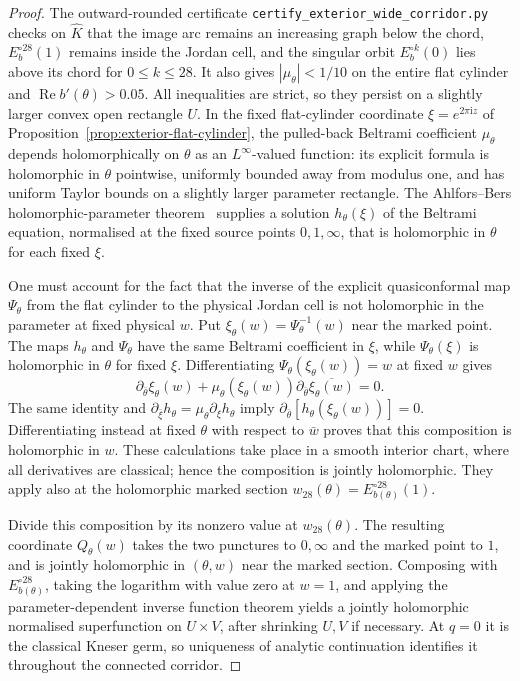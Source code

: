 \documentclass[11pt]{amsart}
\theoremstyle{definition}
\newcommand{\ii}{\mathrm{i}}
\begin{document}
\begin{proof}
The outward-rounded certificate
\texttt{certify\_exterior\_wide\_corridor.py} checks on $\widehat K$
that the image arc remains an increasing graph below the chord,
$E_b^{\circ28}(1)$ remains inside the Jordan cell, and the singular
orbit $E_b^{\circ k}(0)$ lies above its chord for $0\le k\le28$.
It also gives $|\mu_\theta|<1/10$ on the entire flat cylinder and
$\operatorname{Re}b'(\theta)>0.05$.  All inequalities are strict,
so they persist on a slightly larger convex open rectangle $U$.
In the fixed flat-cylinder coordinate
$\xi=e^{2\pi\ii z}$ of
Proposition~\ref{prop:exterior-flat-cylinder}, the pulled-back
Beltrami coefficient $\mu_\theta$ depends holomorphically on
$\theta$ as an $L^\infty$-valued function: its explicit formula is
holomorphic in $\theta$ pointwise, uniformly bounded away from
modulus one, and has uniform Taylor bounds on a slightly larger
parameter rectangle.  The Ahlfors--Bers holomorphic-parameter
theorem~\cite[Thm.~11]{AhlforsBers1960} supplies a solution
$h_\theta(\xi)$ of the Beltrami equation, normalised at the fixed
source points $0,1,\infty$, that is holomorphic in $\theta$ for
each fixed $\xi$.

One must account for the fact that the inverse of the explicit
quasiconformal map $\Psi_\theta$ from the flat cylinder to the
physical Jordan cell is not holomorphic in the parameter at fixed
physical $w$.  Put $\xi_\theta(w)=\Psi_\theta^{-1}(w)$ near the
marked point.  The maps $h_\theta$ and $\Psi_\theta$ have the same
Beltrami coefficient in $\xi$, while $\Psi_\theta(\xi)$ is
holomorphic in $\theta$ for fixed $\xi$.  Differentiating
$\Psi_\theta(\xi_\theta(w))=w$ at fixed $w$ gives
\[
 \partial_{\bar\theta}\xi_\theta(w)
 +\mu_\theta(\xi_\theta(w))
       \partial_{\bar\theta}\overline{\xi_\theta(w)}=0.
\]
The same identity and $\partial_{\bar\xi}h_\theta
=\mu_\theta\partial_\xi h_\theta$ imply
$\partial_{\bar\theta}
  [h_\theta(\xi_\theta(w))]=0$.
Differentiating instead at fixed $\theta$ with respect to
$\bar w$ proves that this composition is holomorphic in $w$.
These calculations take place in a smooth interior chart, where
all derivatives are classical; hence the composition is jointly
holomorphic.  They apply also at the holomorphic marked section
$w_{28}(\theta)=E_{b(\theta)}^{\circ28}(1)$.

Divide this composition by its nonzero value at $w_{28}(\theta)$.
The resulting coordinate $Q_\theta(w)$ takes the two punctures
to $0,\infty$ and the marked point to $1$, and is jointly
holomorphic in $(\theta,w)$ near the marked section.  Composing
with $E_{b(\theta)}^{\circ28}$, taking the logarithm with value
zero at $w=1$, and applying the parameter-dependent inverse
function theorem yields a jointly holomorphic normalised
superfunction on $U\times V$, after shrinking $U,V$ if necessary.
At $q=0$ it is the classical Kneser germ, so uniqueness of analytic
continuation identifies it throughout the connected corridor.


\end{proof}
\end{document}
